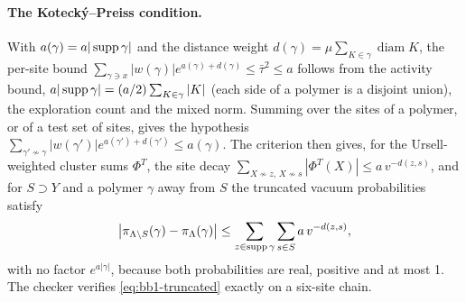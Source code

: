 \paragraph{The Kotecký--Preiss condition.} With $a(\gamma)=a|\operatorname{supp}\gamma|$ and
the distance weight $d(\gamma)=\mu\sum_{K\in\gamma}\operatorname{diam}K$, the
per-site bound
$\sum_{\gamma\ni x}|w(\gamma)|e^{a(\gamma)+d(\gamma)}\le\bar\tau^2\le a$
follows from the activity bound, $a|\operatorname{supp}\gamma|=(a/2)\sum_{K\in\gamma}|K|$
(each side of a polymer is a disjoint union), the exploration count and the
mixed norm. Summing over the sites of a polymer, or of a test set of sites,
gives the hypothesis
$\sum_{\gamma'\not\sim\gamma}|w(\gamma')|e^{a(\gamma')+d(\gamma')}\le
a(\gamma)$. The criterion then gives, for the Ursell-weighted cluster sums
$\Phi^T$, the site decay
$\sum_{X\not\sim z,\,X\not\sim s}|\Phi^T(X)|\le a\,v^{-d(z,s)}$, and for
$S\supset Y$ and a polymer $\gamma$ away from $S$ the truncated vacuum
probabilities satisfy
\begin{equation}
 \bigl|\pi_{\Lambda\setminus S}(\gamma)-\pi_\Lambda(\gamma)\bigr|
 \le\sum_{z\in\operatorname{supp}\gamma}\sum_{s\in S}a\,v^{-d(z,s)} ,
 \label{eq:bb1-truncated}
\end{equation}
with no factor $e^{a|\gamma|}$, because both probabilities are real, positive
and at most 1. The checker verifies \eqref{eq:bb1-truncated} exactly on a
six-site chain.

